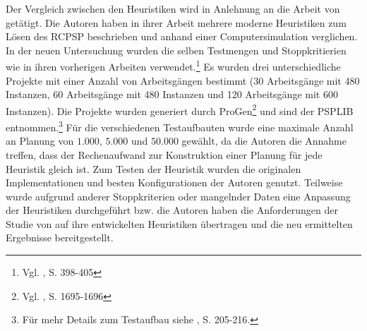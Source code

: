 \documentclass[a4paper,12pt,normalheadings,footexclude,headinclude,liststotoc,nochapterprefix,onecolumn,oneside,parskip,pointlessnumbers]{scrreprt}
\begin{document}
Der Vergleich zwischen den Heuristiken wird in Anlehnung an die Arbeit von \cite{kolisch2006experimental} getätigt. Die Autoren haben in ihrer Arbeit mehrere moderne Heuristiken zum Lösen des RCPSP beschrieben und anhand einer Computersimulation verglichen. In der neuen Untersuchung wurden die selben Testmengen und Stoppkritierien wie in ihren vorherigen Arbeiten verwendet.\footnote{Vgl. \cite{hartmann2000experimental}, S. 398-405} Es wurden drei unterschiedliche Projekte mit einer Anzahl von Arbeitsgängen bestimmt (30 Arbeitsgänge mit 480 Instanzen, 60 Arbeitsgänge mit 480 Instanzen und 120 Arbeitsgänge mit 600 Instanzen). Die Projekte wurden generiert durch ProGen\footnote{Vgl. \cite{kolisch1995characterization}, S. 1695-1696} und sind der PSPLIB entnommen.\footnote{Für mehr Details zum Testaufbau siehe \cite{kolisch1997psplib}, S. 205-216.} Für die verschiedenen Testaufbauten wurde eine maximale Anzahl an Planung von $1.000$, $5.000$ und $50.000$ gewählt, da die Autoren die Annahme treffen, dass der Rechenaufwand zur Konstruktion einer Planung für jede Heuristik gleich ist. %
Zum Testen der Heuristik wurden die originalen Implementationen und besten Konfigurationen der Autoren genutzt. Teilweise wurde aufgrund anderer Stoppkriterien oder mangelnder Daten eine Anpassung der Heuristiken durchgeführt bzw. die Autoren haben die Anforderungen der Studie von \cite{kolisch2006experimental} auf ihre entwickelten Heuristiken übertragen und die neu ermittelten Ergebnisse bereitgestellt.
\end{document}
